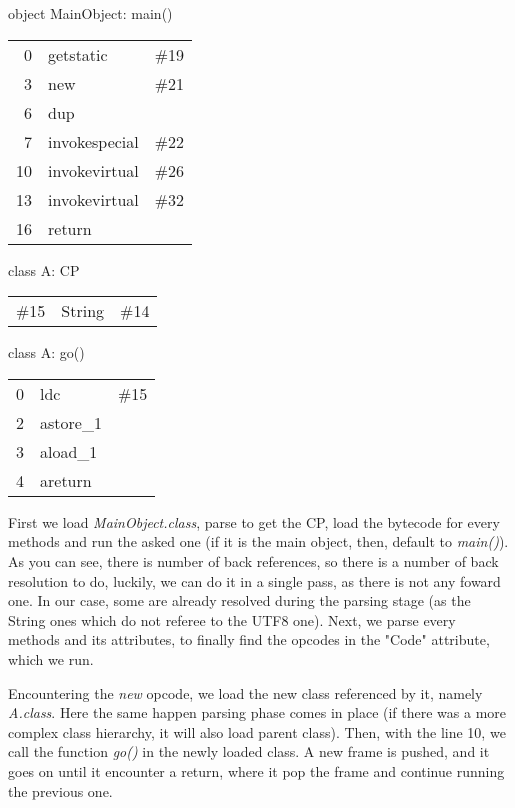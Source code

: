 object MainObject: main()
\newline
\begin{tabular}{r l l} \hline
	0	& getstatic	& \#19	\\
	3	& new		& \#21	\\
	6	& dup		&	\\
	7	& invokespecial	& \#22	\\
	10	& invokevirtual	& \#26	\\
	13	& invokevirtual	& \#32	\\
	16	& return	&	\\
\end{tabular}
\newline

class A: CP
\newline
\begin{tabular}{r l l} \hline
	\#15	& String	& \#14	\\
\end{tabular}
\newline

class A: go()
\newline
\begin{tabular}{r l l} \hline
	0	& ldc		& \#15	\\
	2	& astore\_1	&	\\
	3	& aload\_1	&	\\
	4	& areturn	&	\\
\end{tabular}
\newline

First we load \emph{MainObject.class}, parse to get the CP, load the bytecode
for every methods and run the asked one (if it is the main object, then, default
to \emph{main()}). As you can see, there is number of back references, so there
is a number of back resolution to do, luckily, we can do it in a single pass, as
there is not any foward one. In our case, some are already resolved during
the parsing stage (as the String ones which do not referee to the UTF8 one).
Next, we parse every methods and its attributes, to finally find the opcodes in
the "Code" attribute, which we run.

Encountering the \emph{new} opcode, we load the new class referenced by it,
namely \emph{A.class}. Here the same happen parsing phase comes in place (if
there was a more complex class hierarchy, it will also load parent class).
Then, with the line 10, we call the function \emph{go()} in the newly loaded
class. A new frame is pushed, and it goes on until it encounter a return, where
it pop the frame and continue running the previous one.
